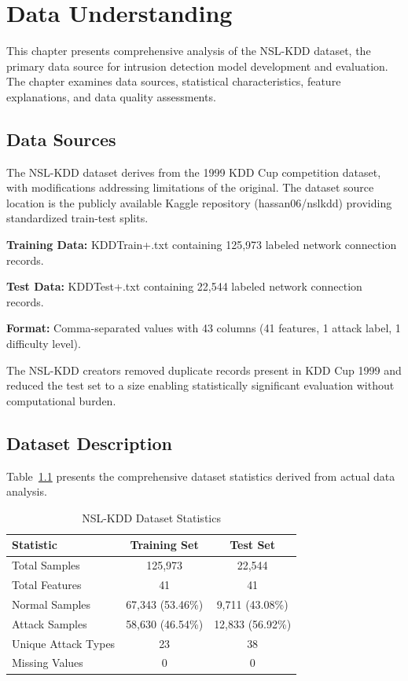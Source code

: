 \documentclass[12pt,a4paper]{report}
\begin{document}
\chapter{Data Understanding}

This chapter presents comprehensive analysis of the NSL-KDD dataset, the primary data source for intrusion detection model development and evaluation. The chapter examines data sources, statistical characteristics, feature explanations, and data quality assessments.

\section{Data Sources}

The NSL-KDD dataset derives from the 1999 KDD Cup competition dataset, with modifications addressing limitations of the original. The dataset source location is the publicly available Kaggle repository (hassan06/nslkdd) providing standardized train-test splits.

\textbf{Training Data:} KDDTrain+.txt containing 125,973 labeled network connection records.

\textbf{Test Data:} KDDTest+.txt containing 22,544 labeled network connection records.

\textbf{Format:} Comma-separated values with 43 columns (41 features, 1 attack label, 1 difficulty level).

The NSL-KDD creators removed duplicate records present in KDD Cup 1999 and reduced the test set to a size enabling statistically significant evaluation without computational burden.

\section{Dataset Description}

Table~\ref{tab:dataset_stats} presents the comprehensive dataset statistics derived from actual data analysis.

\begin{table}[H]
\centering
\caption{NSL-KDD Dataset Statistics}
\label{tab:dataset_stats}
\begin{tabular}{lcc}
\toprule
\textbf{Statistic} & \textbf{Training Set} & \textbf{Test Set} \\
\midrule
Total Samples & 125,973 & 22,544 \\
Total Features & 41 & 41 \\
Normal Samples & 67,343 (53.46\%) & 9,711 (43.08\%) \\
Attack Samples & 58,630 (46.54\%) & 12,833 (56.92\%) \\
Unique Attack Types & 23 & 38 \\
Missing Values & 0 & 0 \\
\bottomrule
\end{tabular}
\end{table}
\end{document}
